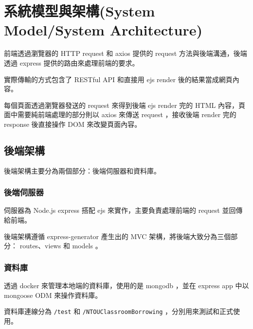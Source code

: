 \documentclass{article}
\begin{document}
\newpage

\begin{center}
	\tableofcontents
\end{center}

\newpage

\section[系統模型與架構(SYSTEM MODEL/SYSTEM ARCHITECTURE)]{系統模型與架構(System Model/System Architecture)}

\begin{center}
	
\end{center}

\bigskip

前端透過瀏覽器的 HTTP request 和 axios 提供的 request 方法與後端溝通，後端透過 express 提供的路由來處理前端的要求。

實際傳輸的方式包含了 RESTful API 和直接用 ejs render 後的結果當成網頁內容。

每個頁面透過瀏覽器發送的 request 來得到後端 ejs render 完的 HTML 內容，頁面中需要純前端處理的部分則以 axios 來傳送 request ，接收後端 render 完的 response 後直接操作 DOM 來改變頁面內容。

\subsection{後端架構}

後端架構主要分為兩個部分：後端伺服器和資料庫。

\subsubsection{後端伺服器}

伺服器為 Node.js express 搭配 ejs 來實作，主要負責處理前端的 request 並回傳給前端。

後端架構遵循 express-generator 產生出的 MVC 架構，將後端大致分為三個部分： routes、views 和 models 。

\subsubsection{資料庫}

透過 docker 來管理本地端的資料庫，使用的是 mongodb ，並在 express app 中以 mongoose ODM 來操作資料庫。

資料庫連線分為 \verb|/test| 和 \verb|/NTOUClassroomBorrowing| ，分別用來測試和正式使用。
\end{document}
